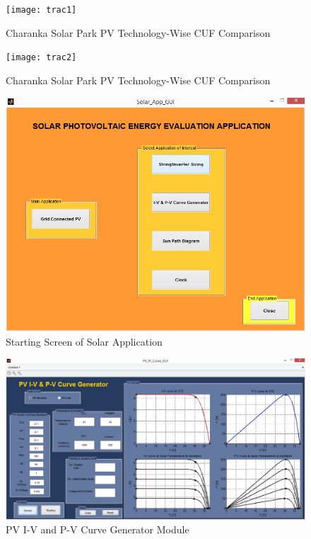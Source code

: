 \documentclass[12pt]{article}
\begin{document}
\begin{figure}[H]
\centering
\texttt{[image: trac1]}
\caption{Charanka Solar Park PV Technology-Wise CUF Comparison}
\label{figc3h17} %
\end{figure}

\begin{figure}[H]
\centering
\texttt{[image: trac2]}
\caption{Charanka Solar Park PV Technology-Wise CUF Comparison}
\label{figc3h18} %
\end{figure}

\begin{figure}[H]
\centering
\includegraphics[scale=0.5]{SolarAppGui1}
\caption{Starting Screen of Solar Application}
\label{figApp1_1} %
\end{figure}

\begin{figure}[H]
\centering
\includegraphics[scale=0.5]{SolarAppGui2}
\caption{PV I-V and P-V Curve Generator Module}
\label{figApp1_2} %
\end{figure}
\end{document}
